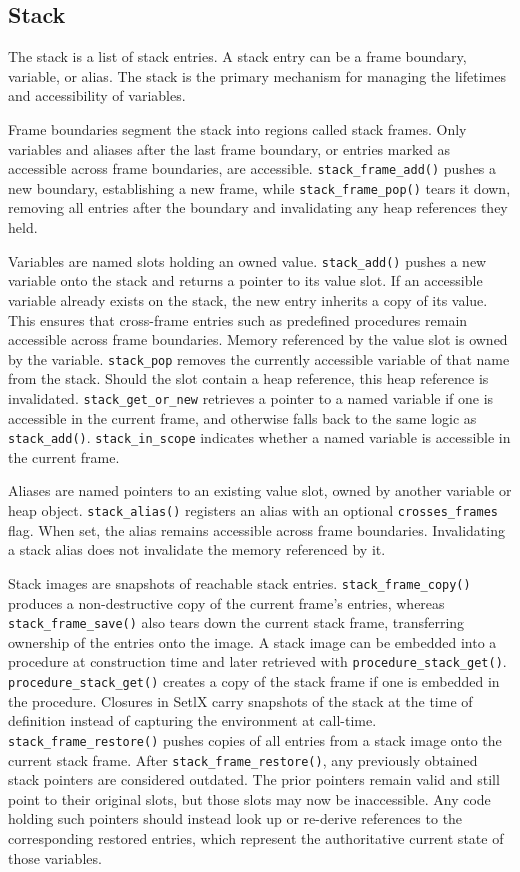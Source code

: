 \subsection{Stack}
\label{subsec:stack}

The stack is a list of stack entries. A stack entry can be a frame boundary, variable, or alias. The stack is the primary mechanism for managing the lifetimes and accessibility of variables.

Frame boundaries segment the stack into regions called stack frames. Only variables and aliases after the last frame boundary, or entries marked as accessible across frame boundaries, are accessible. \texttt{stack\_frame\_add()} pushes a new boundary, establishing a new frame, while \texttt{stack\_frame\_pop()} tears it down, removing all entries after the boundary and invalidating any heap references they held.

Variables are named slots holding an owned value. \texttt{stack\_add()} pushes a new variable onto the stack and returns a pointer to its value slot. If an accessible variable already exists on the stack, the new entry inherits a copy of its value. This ensures that cross-frame entries such as predefined procedures remain accessible across frame boundaries. Memory referenced by the value slot is owned by the variable. \texttt{stack\_pop} removes the currently accessible variable of that name from the stack. Should the slot contain a heap reference, this heap reference is invalidated. \texttt{stack\_get\_or\_new} retrieves a pointer to a named variable if one is accessible in the current frame, and otherwise falls back to the same logic as \texttt{stack\_add()}. \texttt{stack\_in\_scope} indicates whether a named variable is accessible in the current frame.

Aliases are named pointers to an existing value slot, owned by another variable or heap object. \texttt{stack\_alias()} registers an alias with an optional \texttt{crosses\_frames} flag. When set, the alias remains accessible across frame boundaries. Invalidating a stack alias does not invalidate the memory referenced by it.

Stack images are snapshots of reachable stack entries. \texttt{stack\_frame\_copy()} produces a non-destructive copy of the current frame's entries, whereas \texttt{stack\_frame\_save()} also tears down the current stack frame, transferring ownership of the entries onto the image. A stack image can be embedded into a procedure at construction time and later retrieved with \texttt{procedure\_stack\_get()}. \texttt{procedure\_stack\_get()} creates a copy of the stack frame if one is embedded in the procedure. Closures in SetlX carry snapshots of the stack at the time of definition instead of capturing the environment at call-time. \texttt{stack\_frame\_restore()} pushes copies of all entries from a stack image onto the current stack frame. After \texttt{stack\_frame\_restore()}, any previously obtained stack pointers are considered outdated. The prior pointers remain valid and still point to their original slots, but those slots may now be inaccessible. Any code holding such pointers should instead look up or re-derive references to the corresponding restored entries, which represent the authoritative current state of those variables.

